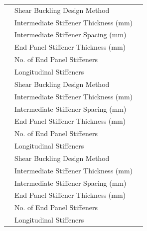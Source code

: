 \documentclass[12pt,a4paper]{report}
\numberwithin{table}{chapter}
\numberwithin{figure}{chapter}
\begin{document}
\begin{longtable}{|C{2.5cm}|L{6.5cm}|>{\arraybackslash}p{6.5cm}|}
\hline
\endlastfoot
{} & \textnormal{Shear Buckling Design Method} &  \\[6pt]
 & \textnormal{Intermediate Stiffener Thickness (mm)} &  \\[6pt]
 & \textnormal{Intermediate Stiffener Spacing (mm)} &  \\[6pt]
 & \textnormal{End Panel Stiffener Thickness (mm)} &  \\[6pt]
 & \textnormal{No. of End Panel Stiffeners} &  \\[6pt]
 & \textnormal{Longitudinal Stiffeners} &  \\[6pt]
\hline
{} & \textnormal{Shear Buckling Design Method} &  \\[6pt]
 & \textnormal{Intermediate Stiffener Thickness (mm)} &  \\[6pt]
 & \textnormal{Intermediate Stiffener Spacing (mm)} &  \\[6pt]
 & \textnormal{End Panel Stiffener Thickness (mm)} &  \\[6pt]
 & \textnormal{No. of End Panel Stiffeners} &  \\[6pt]
 & \textnormal{Longitudinal Stiffeners} &  \\[6pt]
\hline
{} & \textnormal{Shear Buckling Design Method} &  \\[6pt]
 & \textnormal{Intermediate Stiffener Thickness (mm)} &  \\[6pt]
 & \textnormal{Intermediate Stiffener Spacing (mm)} &  \\[6pt]
 & \textnormal{End Panel Stiffener Thickness (mm)} &  \\[6pt]
 & \textnormal{No. of End Panel Stiffeners} &  \\[6pt]
 & \textnormal{Longitudinal Stiffeners} &  \\[6pt]
\hline
\end{longtable}

\vspace{1em}
\end{document}
